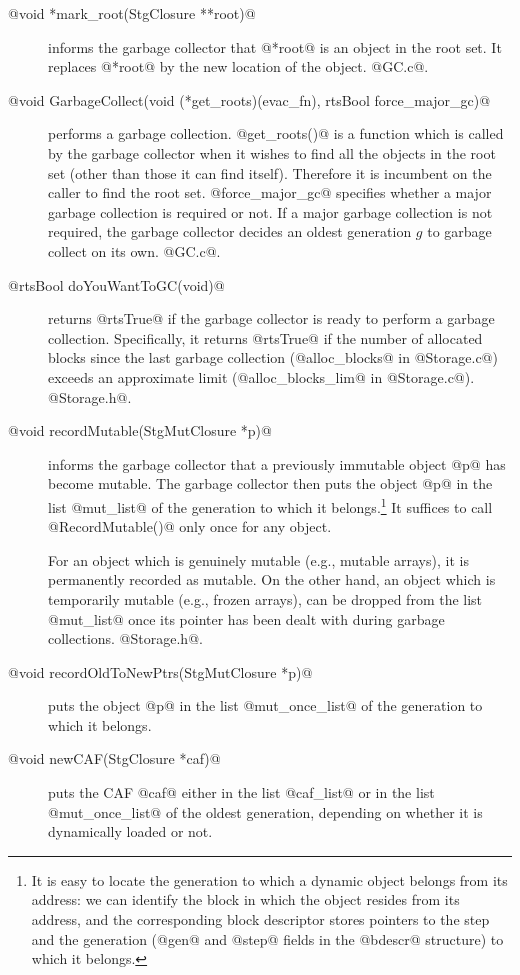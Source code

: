 \documentclass{article}
\begin{document}
\begin{description}
\item[@void *mark\_root(StgClosure **root)@] informs the garbage collector
that @*root@ is an object in the root set. It replaces @*root@ by 
the new location of the object. @GC.c@.
\item[@void GarbageCollect(void (*get\_roots)(evac\_fn), rtsBool force\_major\_gc)@]
performs a garbage collection. 
@get_roots()@ is a function which is called by the garbage collector when
it wishes to find all the objects in the root set (other than those
it can find itself).
Therefore it is incumbent on the caller to find the root set.
@force_major_gc@ specifies whether a major garbage collection is required
or not. If a major garbage collection is not required, the garbage collector
decides an oldest generation $g$ to garbage collect on its own.
@GC.c@.
\item[@rtsBool doYouWantToGC(void)@] returns @rtsTrue@ if the garbage
collector is ready to perform a garbage collection. Specifically, it returns
@rtsTrue@ if the number of allocated blocks since the last garbage collection
(@alloc_blocks@ in @Storage.c@) exceeds an approximate limit 
(@alloc_blocks_lim@ in @Storage.c@).
@Storage.h@.
\item[@void recordMutable(StgMutClosure *p)@] informs the garbage collector
that a previously immutable object @p@ has become mutable.
The garbage collector then puts the object @p@ in the list @mut_list@ of the 
generation to which it belongs.\footnote{It is easy to 
locate the generation to which a dynamic object belongs from its address: 
we can identify the block in which the object resides from its address,
and the corresponding block descriptor stores pointers 
to the step and the generation (@gen@ and @step@ fields in the @bdescr@ 
structure) to which it belongs.}
It suffices to call @RecordMutable()@ only once for any object. 

For an object which is genuinely mutable (e.g., mutable arrays), 
it is permanently recorded as mutable. 
On the other hand, 
an object which is temporarily mutable (e.g., frozen arrays),
can be dropped from the list @mut_list@ once its pointer has been dealt with
during garbage collections. @Storage.h@.
\item[@void recordOldToNewPtrs(StgMutClosure *p)@] puts the object @p@ in the
list @mut_once_list@ of the generation to which it belongs.
\item[@void newCAF(StgClosure *caf)@] puts the CAF @caf@ either 
in the list @caf_list@ or
in the list @mut_once_list@ of the oldest generation,
depending on whether it is dynamically loaded or not.
\end{description}
\end{document}
